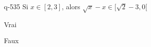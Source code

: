 \begin{truefalse}{q-535}
Si $x\in[2,3]$, alors $\sqrt x-x\in[\sqrt 2-3,0[$
\item* Vrai
\item Faux
\end{truefalse}

